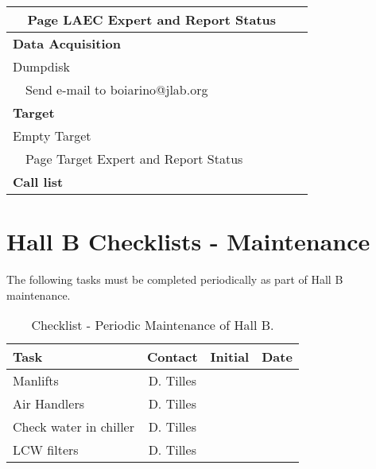 \begin{table}[p]
\begin{center}
\begin{tabular}{|l|c|c|}
~~Page LAEC Expert and Report Status          & & \\ \hline
\bf{Data Acquisition}                         & & \\
Dumpdisk                                      & & \\ 
~~Send e-mail to boiarino@jlab.org            & & \\ \hline
\bf{Target}                                   & & \\
Empty Target                                  & & \\
~~Page Target Expert and Report Status        & & \\ \hline
\bf{Call list}                                & & \\ \hline
\end{tabular}
\end{center}
\end{table}             

\newpage

\begin{table}[p]
\section{Hall B Checklists - Maintenance}
The following tasks must be completed periodically as
part of Hall B maintenance. 
\caption{\label{table:maintenance} Checklist - Periodic Maintenance of Hall B.}
\begin{center}
\begin{tabular}{|l|c|c|c|} \hline 
Task & \hspace{1cm}Contact\hspace{1cm} &  Initial & 
                        \hspace{1cm}Date\hspace{1cm}  \\ \hline
Manlifts                 & D. Tilles    &  &   \\ \hline
Air Handlers             & D. Tilles    &  &   \\ \hline
Check water in chiller   & D. Tilles    &  &   \\ \hline
LCW filters              & D. Tilles    &  &   \\ \hline
\end{tabular}
\end{center}
\end{table}             
